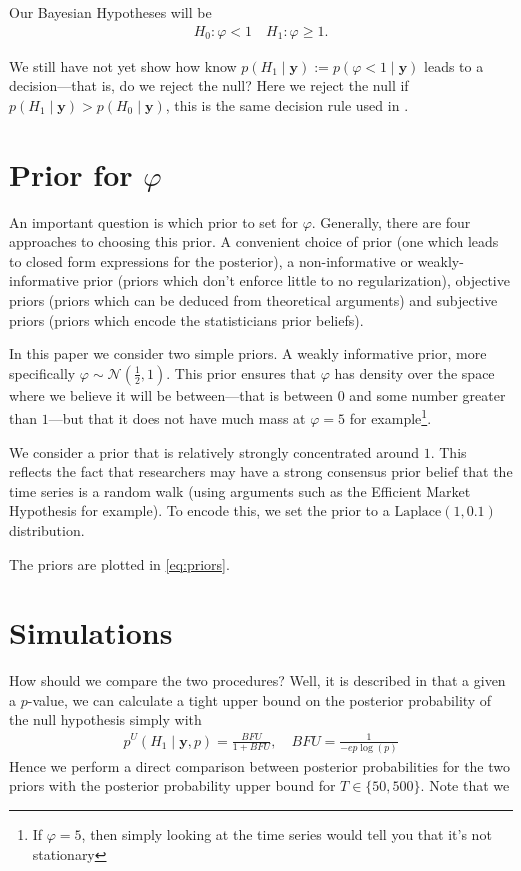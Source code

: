 \documentclass{article}
\theoremstyle{definition}
\theoremstyle{exercise}
\theoremstyle{remark}
\begin{document}
Our Bayesian Hypotheses will be 
\begin{align*}
    H_0: \varphi < 1 \quad H_1: \varphi \geq 1.
\end{align*}


We still have not yet show how know $p(H_1 \;|\; \mathbf{y}) := p(\varphi < 1 \;|\; \mathbf{y})$ leads to a decision---that is, do we reject the null?
Here we reject the null if $p(H_1 \;|\; \mathbf{y}) > p(H_0 \;|\; \mathbf{y})$, this is the same decision rule used in \citep{so1999bayesian}.

\section*{Prior for $\varphi$}%
An important question is which prior to set for $\varphi$.
Generally, there are four approaches to choosing this prior. A convenient choice of prior (one which leads to closed form expressions for the posterior), a non-informative or weakly-informative prior (priors which don't enforce little to no regularization), objective priors (priors which can be deduced from theoretical arguments) and subjective priors (priors which encode the statisticians prior beliefs). %

In this paper we consider two simple priors.
A weakly informative prior, more specifically $\varphi \sim \mathcal{N}(\frac{1}{2}, 1)$. This prior ensures that $\varphi$ has density over the space where we believe it will be between---that is between $0$ and some number greater than $1$---but that it does not have much mass at $\varphi = 5$ for example\footnote{If $\varphi = 5$, then simply looking at the time series would tell you that it's not stationary}.

We consider a prior that is relatively strongly concentrated around $1$. This reflects the fact that researchers may have a strong consensus prior belief that the time series is a random walk (using arguments such as the Efficient Market Hypothesis for example).
To encode this, we set the prior to a $\text{Laplace}(1,0.1)$ distribution.

The priors are plotted in \autoref{eq:priors}.

\section*{Simulations}%

How should we compare the two procedures?
%
Well, it is described in \cite{benjamin2019three} that a given a $p$-value, we can calculate a tight upper bound on the posterior probability of the null hypothesis simply with
\begin{align*}
    p^U(H_1 \;|\; \mathbf{y}, p) = \frac{BFU}{1 + BFU}, \quad BFU = \frac{1}{-ep\log (p)}
\end{align*}
Hence we perform a direct comparison between posterior probabilities for the two priors with the posterior probability upper bound for $T \in \{ 50, 500\}$.
Note that we 
\end{document}
